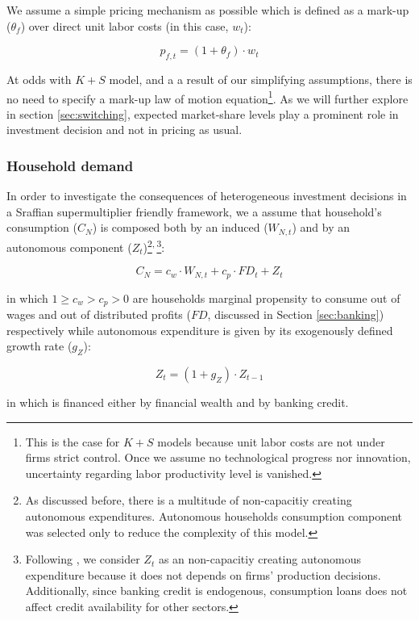 \documentclass{SelfArx}
\begin{document}
We assume a simple pricing mechanism as possible which is defined as a mark-up (\(\theta_{f}\)) over direct unit labor costs (in this case, \(w_{t}\)):
\begin{latex}
\begin{equation}
p_{f,t} = (1+\theta_{f})\cdot w_{t}
\end{equation}
\end{latex}
At odds with \(K+S\) model, and a a result of our simplifying assumptions, there is no need to specify a mark-up law of motion equation\footnote{This is the case for \(K+S\) models because unit labor costs are not under firms strict control. Once we assume no technological progress nor innovation, uncertainty regarding labor productivity level is vanished.}.
As we will further explore in section \ref{sec:switching}, expected market-share levels play a prominent role in investment decision and not in pricing as usual.



\subsubsection{Household demand}
\label{sec:org5b038d7}


In order to investigate the consequences of heterogeneous investment decisions in a Sraffian supermultiplier friendly framework, we a assume that household's consumption (\(C_{N}\)) is composed both by an induced (\(W_{N,t}\)) and by an autonomous component (\(Z_{t}\))\footnote{As discussed before, there is a multitude of non-capacitiy creating autonomous expenditures. Autonomous households consumption component was selected only to reduce the complexity of this model.}\textsuperscript{,}\,\footnote{Following \textcite{serrano_1995_Long}, we consider \(Z_{t}\) as an non-capacitiy creating autonomous expenditure because it does not depends on firms' production decisions. Additionally, since banking credit is endogenous, consumption loans does not affect credit availability for other sectors.}:

\begin{latex}
\begin{equation}
C_{N} = c_{w}\cdot W_{N,t} + c_{p}\cdot FD_{t} + Z_{t}
\end{equation}
\end{latex}
in which \(1 \geq c_{w} > c_{p} > 0\) are households marginal propensity to consume out of wages and out of distributed profits (\(FD\), discussed in Section \ref{sec:banking}) respectively while autonomous expenditure is given by its exogenously defined growth rate (\(g_{Z}\)):
\begin{latex}
\begin{equation}
Z_{t} = (1+g_{Z})\cdot Z_{t-1}
\end{equation}
\end{latex}
in which is financed either by financial wealth and by banking credit.
\end{document}
